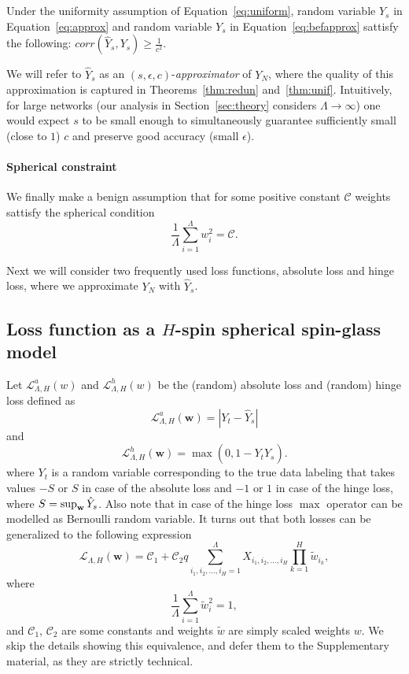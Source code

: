 \documentclass[twoside]{article}
\begin{document}
\begin{theorem}
Under the uniformity assumption of Equation~\ref{eq:uniform}, random variable $\hat{Y}_s$ in Equation~\ref{eq:approx} and random variable $Y_s$ in Equation~\ref{eq:befapprox} sattisfy the following: $corr(\hat{Y}_s,Y_s) \geq \frac{1}{c^2}$.
\label{thm:unif}
\end{theorem}
We will refer to $\hat{Y}_s$ as an $(s,\epsilon,c)$-\textit{approximator} of $Y_N$, where the quality of this approximation is captured in Theorems~\ref{thm:redun} and~\ref{thm:unif}. Intuitively, for large networks (our analysis in Section~\ref{sec:theory} considers $\Lambda \rightarrow \infty$) one would expect $s$ to be small enough to simultaneously guarantee sufficiently small (close to $1$) $c$ and preserve good accuracy (small $\epsilon$).

\paragraph{Spherical constraint}
We finally make a benign assumption that for some positive constant $\mathcal{C}$ weights sattisfy the spherical condition 
\begin{equation}
\frac{1}{\Lambda}\sum_{i=1}^{\Lambda}w_i^2 = \mathcal{C}.
\label{eq:befspherical}
\end{equation}

Next we will consider two frequently used loss functions, absolute loss and hinge loss, where we approximate $Y_N$ with $\hat{Y}_s$. 

\subsection{Loss function as a $H$-spin spherical spin-glass model}
\label{subsec:LFSG}

Let $\mathcal{L}^a_{\Lambda,H}(w)$ and $\mathcal{L}^h_{\Lambda,H}(w)$ be the (random) absolute loss and (random) hinge loss defined as
\[\mathcal{L}^a_{\Lambda,H}({\bm w}) = |Y_t - \hat{Y}_s|
\]
and
\[\mathcal{L}^h_{\Lambda,H}({\bm w}) = \max(0,1-Y_t\hat{Y}_s).
\]
where $Y_t$ is a random variable corresponding to the true data labeling that takes values $-S$ or $S$ in case of the absolute loss and $-1$ or $1$ in case of the hinge loss, where $S = \sup_{\bf{w}}{\hat{Y}_s}$. Also note that in case of the hinge loss $\max$ operator can be modelled as Bernoulli random variable. It turns out that both losses can be generalized to the following expression
\[\mathcal{L}_{\!\Lambda,H}({\bm w}) = \mathcal{C}_1 + \mathcal{C}_2q\sum_{i_1,i_2,\dots,i_H=1}^{\Lambda}X_{i_1,i_2,\dots,i_H}\prod_{k = 1}^{H}\tilde{w}_{i_k},
\]
where
\begin{equation}
\frac{1}{\Lambda}\sum_{i=1}^{\Lambda}\tilde{w}_i^2 = 1,
\label{eq:spherical}
\end{equation}
and $\mathcal{C}_1$, $\mathcal{C}_2$ are some constants and weights $\tilde{w}$ are simply scaled weights $w$.
We skip the details showing this equivalence, and defer them to the Supplementary material, as they are strictly technical. 
\end{document}
